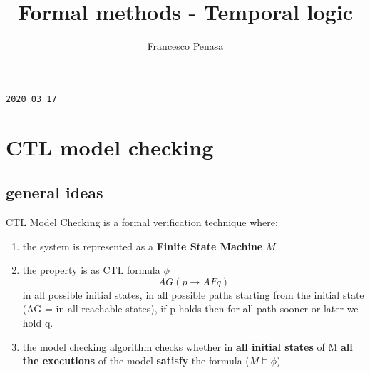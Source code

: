 \documentclass[11pt]{article}
\begin{document}
\author{Francesco Penasa}
\title{Formal methods - Temporal logic}
\maketitle

\medskip

\texttt{2020 03 17}
\section{CTL model checking} %
\label{sec:ctl_model_checking}

\subsection{general ideas} %
\label{sub:general_ideas}

CTL Model Checking is a formal verification technique where:
\begin{enumerate}
	\item the system is represented as a \textbf{Finite State Machine} $M$
	
	\item the property is as CTL formula $\phi$ \[
		AG(p \rightarrow AF q)
	\] in all possible initial states, in all possible paths starting from the initial state (AG = in all reachable states), if p holds then for all path sooner or later we hold q.

	\item the model checking algorithm checks whether in \textbf{all initial states} of M \textbf{all the executions} of the model \textbf{satisfy} the formula ($M \models \phi$).
\end{enumerate}
\end{document}
